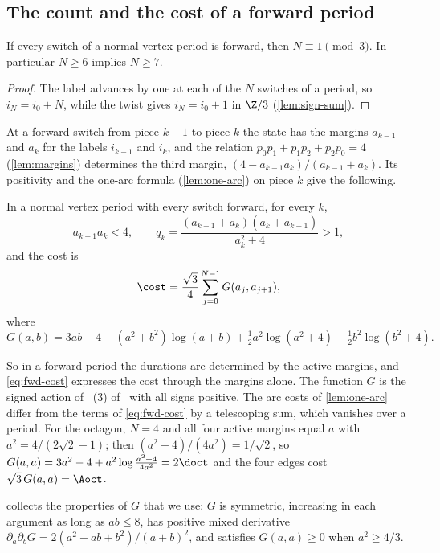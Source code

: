 \subsection{The count and the cost of a forward period}

\begin{lemma}\label{lem:fwd-count}
If every switch of a normal vertex period is forward, then $N\equiv1\pmod 3$. In particular
$N\ge6$ implies $N\ge7$.
\end{lemma}

\begin{proof}
The label advances by one at each of the $N$ switches of a period, so $i_N=i_0+N$, while the twist
gives $i_N=i_0+1$ in $\Z/3$ (\cref{lem:sign-sum}).
\end{proof}

At a forward switch from piece $k-1$ to piece $k$ the state has the margins $a_{k-1}$ and $a_k$ for
the labels $i_{k-1}$ and $i_k$, and the relation $p_0p_1+p_1p_2+p_2p_0=4$ (\cref{lem:margins})
determines the third margin, $(4-a_{k-1}a_k)/(a_{k-1}+a_k)$. Its positivity and the one-arc formula
(\cref{lem:one-arc}) on piece $k$ give the following.

\begin{lemma}\label{lem:fwd-cycle}
In a normal vertex period with every switch forward, for every $k$,
\[
a_{k-1}a_k<4,\qquad
q_k=\frac{(a_{k-1}+a_k)(a_k+a_{k+1})}{a_k^2+4}>1,
\]
and the cost is
\begin{equation}\label{eq:fwd-cost}
\cost=\frac{\sqrt3}{4}\sum_{j=0}^{N-1}G(a_j,a_{j+1}),
\end{equation}
where
\[
G(a,b)=3ab-4-(a^2+b^2)\log(a+b)+\tfrac12a^2\log(a^2+4)+\tfrac12b^2\log(b^2+4).
\]
\end{lemma}

So in a forward period the durations are determined by the active margins, and
\eqref{eq:fwd-cost} expresses the cost through the margins alone. The function $G$ is the signed
action of ~(3) of~\cite{Notes} with all signs positive.
The arc costs of \cref{lem:one-arc} differ from the terms of \eqref{eq:fwd-cost} by a telescoping
sum, which vanishes over a period. For the octagon, $N=4$ and all four active margins equal $a$ with
$a^2=4/(2\sqrt2-1)$; then $(a^2+4)/(4a^2)=1/\sqrt2$, so
$G(a,a)=3a^2-4+a^2\log\frac{a^2+4}{4a^2}=2\doct$ and the four edges cost
$\sqrt3\,G(a,a)=\Aoct$.

 collects the properties of $G$ that we use: $G$ is symmetric, increasing in
each argument as long as $ab\le8$, has positive mixed derivative
$\partial_a\partial_bG=2(a^2+ab+b^2)/(a+b)^2$, and satisfies $G(a,a)\ge0$ when $a^2\ge4/3$.

